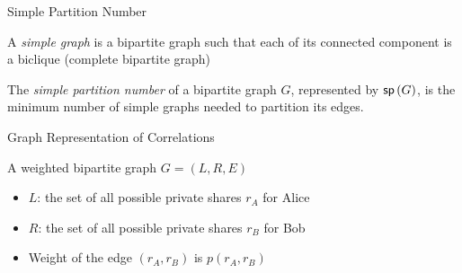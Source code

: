 \begin{frame}{Simple Partition Number}
	\begin{definition}
		A \textit{simple graph} is a bipartite graph such that each of its
		connected component is a biclique (complete bipartite graph)
	\end{definition}
	\pause
	\begin{definition}
		The \textit{simple partition number} of a bipartite graph $G$, represented
		by $\sp G$, is the minimum number of simple graphs needed to
		partition its edges.
	\end{definition}
	\pause
	
\end{frame}
\begin{frame}{Graph Representation of Correlations}
	\begin{definition}
		A weighted bipartite graph $  G = (L, R, E) $
		\begin{itemize}
	  		\item $ L $: the set of all possible private shares $ r_A $ for Alice
	  		\item $ R $: the set of all possible private shares $ r_B $ for Bob
			\item Weight of the edge $ (r_A, r_B) $ is  $ p(r_A, r_B) $
		\end{itemize}
	\end{definition}
	
\end{frame}

